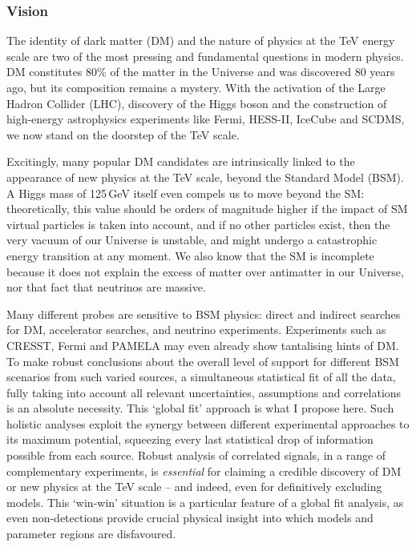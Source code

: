 \documentclass[10pt,oneside,twocolumn,a4paper]{article}
\author{Pat Scott}
\date{}
\begin{document}
\thispagestyle{fancy}


\subsubsection*{Vision}

The identity of dark matter (DM) and the nature of physics at the TeV energy scale are two of the most pressing and fundamental questions in modern physics.  DM constitutes 80\% of the matter in the Universe and was discovered 80 years ago, but its composition remains a mystery.  With the activation of the Large Hadron Collider (LHC), discovery of the Higgs boson and the construction of high-energy astrophysics experiments like Fermi, HESS-II, IceCube and SCDMS, we now stand on the doorstep of the TeV scale.  

Excitingly, many popular DM candidates are intrinsically linked to the appearance of new physics at the TeV scale, beyond the Standard Model (BSM).  A Higgs mass of 125\,GeV itself even compels us to move beyond the SM: theoretically, this value should be orders of magnitude higher if the impact of SM virtual particles is taken into account, and if no other particles exist, then the very vacuum of our Universe is unstable, and might undergo a catastrophic energy transition at any moment.  We also know that the SM is incomplete because it does not explain the excess of matter over antimatter in our Universe, nor that fact that neutrinos are massive.

Many different probes are sensitive to BSM physics: direct and indirect searches for DM, accelerator searches, and neutrino experiments.  Experiments such as CRESST, Fermi and PAMELA may even already show tantalising hints of DM.  To make robust conclusions about the overall level of support for different BSM scenarios from such varied sources, a simultaneous statistical fit of all the data, fully taking into account all relevant uncertainties, assumptions and correlations is an absolute necessity.  This `global fit' approach is what I propose here.  Such holistic analyses exploit the synergy between different experimental approaches to its maximum potential, squeezing every last statistical drop of information possible from each source.  Robust analysis of correlated signals, in a range of complementary experiments, is \textit{essential} for claiming a credible discovery of DM or new physics at the TeV scale -- and indeed, even for definitively excluding models.  This `win-win' situation is a particular feature of a global fit analysis, as even non-detections provide crucial physical insight into which models and parameter regions are disfavoured.
\end{document}
